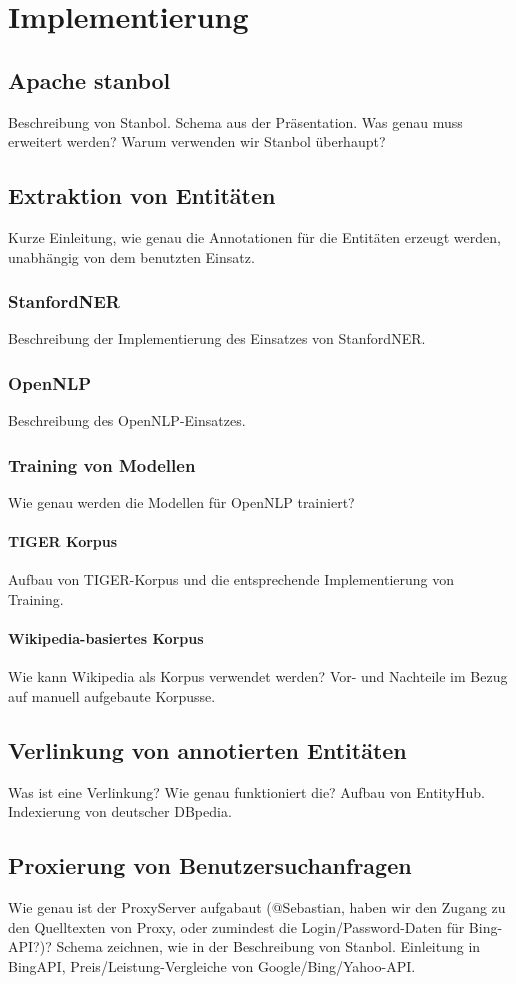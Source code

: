 \chapter{Implementierung}
\label{sec:Implementierung}

\section{Apache stanbol}
Beschreibung von Stanbol. Schema aus der Präsentation. Was genau muss erweitert werden? Warum verwenden wir Stanbol überhaupt?

\section{Extraktion von Entitäten}
Kurze Einleitung, wie genau die Annotationen für die Entitäten erzeugt werden, unabhängig von dem benutzten Einsatz.

\subsection{StanfordNER} 
Beschreibung der Implementierung des Einsatzes von StanfordNER. 

\subsection{OpenNLP}
Beschreibung des OpenNLP-Einsatzes.

\subsection{Training von Modellen}
Wie genau werden die Modellen für OpenNLP trainiert?

\subsubsection{TIGER Korpus}
Aufbau von TIGER-Korpus und die entsprechende Implementierung von Training.

\subsubsection{Wikipedia-basiertes Korpus}
Wie kann Wikipedia als Korpus verwendet werden? Vor- und Nachteile im Bezug auf manuell aufgebaute Korpusse.

\section{Verlinkung von annotierten Entitäten}
Was ist eine Verlinkung? Wie genau funktioniert die? Aufbau von EntityHub. Indexierung von deutscher DBpedia.

\section{Proxierung von Benutzersuchanfragen}
Wie genau ist der ProxyServer aufgabaut (@Sebastian, haben wir den Zugang zu den Quelltexten von Proxy, oder zumindest die Login/Password-Daten für Bing-API?)? Schema zeichnen, wie in der Beschreibung von Stanbol. Einleitung in BingAPI, Preis/Leistung-Vergleiche von Google/Bing/Yahoo-API.